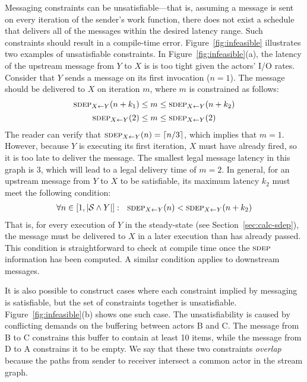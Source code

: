 Messaging constraints can be unsatisfiable---that is, assuming a
message is sent on every iteration of the sender's work function,
there does not exist a schedule that delivers all of the messages
within the desired latency range.  Such constraints should result in a
compile-time error.  Figure~\ref{fig:infeasible} illustrates two
examples of unsatisfiable constraints.  In
Figure~\ref{fig:infeasible}(a), the latency of the upstream message
from $Y$ to $X$ is is too tight given the actors' I/O rates.  Consider
that $Y$ sends a message on its first invocation ($n=1$).  The message
should be delivered to $X$ on iteration $m$, where $m$ is constrained
as follows:
\begin{equation*}
\begin{array}{c}
\sdepf{X}{Y}(n+k_1) \le m \le \sdepf{X}{Y}(n+k_2) \\[1Ex]
\sdepf{X}{Y}(2) \le m \le \sdepf{X}{Y}(2)
\end{array}
\end{equation*}
The reader can verify that $\sdepf{X}{Y}(n) = \lceil n/3 \rceil$,
which implies that $m=1$.  However, because $Y$ is executing its first
iteration, $X$ must have already fired, so it is too late to deliver
the message.  The smallest legal message latency in this graph is 3,
which will lead to a legal delivery time of $m=2$.  In general, for an
upstream message from $Y$ to $X$ to be satisfiable, its maximum
latency $k_2$ must meet the following condition:
\begin{equation*}
\begin{array}{c}
\forall n \in [1, |{\cal S} \wedge Y|]:~~\sdepf{X}{Y}(n) < \sdepf{X}{Y}(n+k_2)
\end{array}
\end{equation*}
That is, for every execution of $Y$ in the steady-state (see
Section~\ref{sec:calc-sdep}), the message must be delivered to $X$ in
a later execution than has already passed.  This condition is
straightforward to check at compile time once the $\textsc{sdep}$ information
has been computed.  A similar condition applies to downstream
messages.

It is also possible to construct cases where each constraint implied
by messaging is satisfiable, but the set of constraints together is
unsatisfiable.  Figure~\ref{fig:infeasible}(b) shows one such case.
The unsatisfiability is caused by conflicting demands on the buffering
between actors B and C.  The message from B to C constrains this
buffer to contain at least 10 items, while the message from D to A
constrains it to be empty.  We say that these two constraints {\it
overlap} because the paths from sender to receiver intersect a common
actor in the stream graph.

